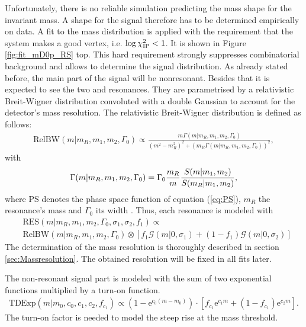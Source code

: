 Unfortunately, there is no reliable simulation predicting the mass shape for the \Dz\proton invariant mass. 
A shape for the signal therefore has to be determined empirically on data. 
A fit to the \Dz\proton mass distribution is applied with the requirement that the \Dz\proton\muon system makes a good vertex, i.e. $\log \chi^2_{\text{IP}} < 1$.
It is shown in Figure \ref{fig:fit_mD0p_RS} top.
This hard requirement strongly suppresses combinatorial background and allows to determine the signal distribution.
As already stated before, the main part of the signal will be nonresonant.
Besides that it is expected to see the two \LcResI and \LcResII resonances.
They are parametrised by a relativistic Breit-Wigner distribution convoluted with a double Gaussian to account for the detector's mass resolution.
The relativistic Breit-Wigner distribution is defined as follows:
\begin{align}
    \text{RelBW}(m|m_R, m_1, m_2, \Gamma_0) \propto 
    \frac{m \Gamma(m|m_R, m_1, m_2, \Gamma_0)}{(m^2-m_R^2)^2 + (m_R \Gamma(m|m_R, m_1, m_2, \Gamma_0))^2}, \label{eq:RelBW}
\end{align}
with 
\begin{align}
    \Gamma(m|m_R, m_1, m_2, \Gamma_0) = \Gamma_0 \frac{m_R}{m} \frac{S(m| m_1, m_2)}{S(m_R| m_1, m_2)}, 
\end{align}
where PS denotes the phase space function of equation (\ref{eq:PS}), $m_R$ the resonance's mass and $\Gamma_0$ its width \cite{Lb_FF}.
Thus, each resonance is modeled with
\begin{align}
    &\text{RES}(m| m_R, m_1, m_2, \Gamma_0, \sigma_1, \sigma_2, f_1) \propto \nonumber \\
    &\text{RelBW}(m| m_R, m_1, m_2, \Gamma_0) \otimes \left[f_1 \mathcal{G}(m|0,\sigma_1) + (1-f_1) \mathcal{G}(m|0,\sigma_2) \right] \label{eq:RES}
\end{align}
The determination of the mass resolution is thoroughly described in section \ref{sec:Massresolution}. 
The obtained resolution will be fixed in all fits later.

The non-resonant signal part is modeled with the sum of two exponential functions multiplied by a turn-on function.
\begin{align}
    \text{TDExp}(m|m_0, c_0, c_1, c_2, f_{c_1}) \propto \left( 1 - \mathrm{e}^{c_0(m-m_0)} \right) \cdot \left[ f_{c_1} \mathrm{e}^{c_1m} + (1-f_{c_1}) \mathrm{e}^{c_2m} \right]. \label{eq:TDExp}
\end{align}
The turn-on factor is needed to model the steep rise at the \Dz\proton mass threshold.

